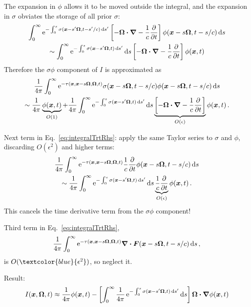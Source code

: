 \documentclass{beamer}
\newcommand{\epsiloncolor}[1]{\textcolor{blue}{#1}}
\begin{document}
\begin{frame}
 The expansion in $\phi$ allows it to be moved outside the integral, and the
 expansion in $\sigma$ obviates the storage of all prior $\sigma$:
\begin{multline*}
  \int_{0}^{\infty} \mathop{}\!\mathrm{e}^{- \int_{0}^{s} \sigma(\bm{x}-s'\bm{\Omega}, t-s'/c) \mathop{}\!\mathrm{d} s'}
\left[ -\bm{\Omega} \bm{\cdot} \bm{\nabla} - \frac1c \frac{\partial }{\partial t} \right] \phi(\bm{x} - s \bm{\Omega}, t-s/c)
\mathop{}\!\mathrm{d} s
\\
\sim \int_{0}^{\infty} \mathop{}\!\mathrm{e}^{- \int_{0}^{s} \sigma(\bm{x}-s'\bm{\Omega}, t)
\mathop{}\!\mathrm{d} s'} \mathop{}\!\mathrm{d} s
\left[ -\bm{\Omega} \bm{\cdot} \bm{\nabla} - \frac1c \frac{\partial }{\partial t} \right] \phi(\bm{x}, t)
\end{multline*}
Therefore the $\sigma\phi$ component of $I$ is approximated as
\begin{multline*}
  \frac{1}{4\pi}\int_{0}^{\infty} \mathop{}\!\mathrm{e}^{ -\tau(\bm{x}, \bm{x} - s
  \bm{\Omega}, \bm{\Omega}, t)} \sigma(\bm{x} - s \bm{\Omega}, t-s/c)
  \phi(\bm{x} - s \bm{\Omega}, t-s/c) \mathop{}\!\mathrm{d} s
  \\
  \sim 
  \frac{1}{4\pi}\underbrace{\phi(\bm{x}, t)}_{O(1)}
  + \frac{1}{4\pi}\int_{0}^{\infty} \mathop{}\!\mathrm{e}^{- \int_{0}^{s} \sigma(\bm{x}-s'\bm{\Omega}, t)
\mathop{}\!\mathrm{d} s'} \mathop{}\!\mathrm{d} s
\underbrace{\left[ -\bm{\Omega} \bm{\cdot} \bm{\nabla} - \frac1c \frac{\partial }{\partial t} \right]}_{O(\epsilon)} \phi(\bm{x}, t)\,.
\end{multline*}
\end{frame}
\begin{frame}
  Next term in Eq.~\eqref{eq:integralTrtRhs}: apply the same Taylor series to
  $\sigma$ and $\phi$, discarding $O(\epsilon^2)$ and higher terms:
\begin{multline*}
  \frac{1}{4\pi}\int_{0}^{\infty} \mathop{}\!\mathrm{e}^{ -\tau(\bm{x}, \bm{x} - s
  \bm{\Omega}, \bm{\Omega}, t)}
  \frac{1}{c} \frac{\partial }{\partial t}\phi(\bm{x} - s \bm{\Omega}, t-s/c) \mathop{}\!\mathrm{d} s
 \\
 \sim 
  \frac{1}{4\pi}\int_{0}^{\infty} \mathop{}\!\mathrm{e}^{- \int_{0}^{s} \sigma(\bm{x}-s'\bm{\Omega}, t)
  \mathop{}\!\mathrm{d} s'} \mathop{}\!\mathrm{d} s
  \underbrace{\frac{1}{c} \frac{\partial }{\partial t}}_{O(\epsilon)}\phi(\bm{x}, t)\,.
\end{multline*}
This cancels the time derivative term from the $\sigma\phi$ component!

Third term in Eq.~\eqref{eq:integralTrtRhs},
  \begin{equation*}
    \frac{1}{4\pi}\int_{0}^{\infty} \mathop{}\!\mathrm{e}^{ -\tau(\bm{x}, \bm{x} - s
    \bm{\Omega}, \bm{\Omega}, t)}
    \bm{\nabla} \bm{\cdot} \bm{F}(\bm{x} - s \bm{\Omega}, t-s/c) \mathop{}\!\mathrm{d} s\,,
  \end{equation*}
is $O(\epsiloncolor{\epsilon^2})$, so neglect it.

Result: 
\begin{equation} \label{eq:anisotropicIntensity}
  I(\bm{x}, \bm{\Omega}, t) \approx
  \frac{1}{4\pi}\phi(\bm{x}, t) - \left[ \int_{0}^{\infty} \frac{1}{4\pi}
  \mathop{}\!\mathrm{e}^{- \int_{0}^{s} \sigma(\bm{x}-s'\bm{\Omega}, t)
  \mathop{}\!\mathrm{d} s'} \mathop{}\!\mathrm{d} s\right]
\bm{\Omega} \bm{\cdot} \bm{\nabla} \phi(\bm{x}, t)
\end{equation}
\end{frame}
\end{document}
